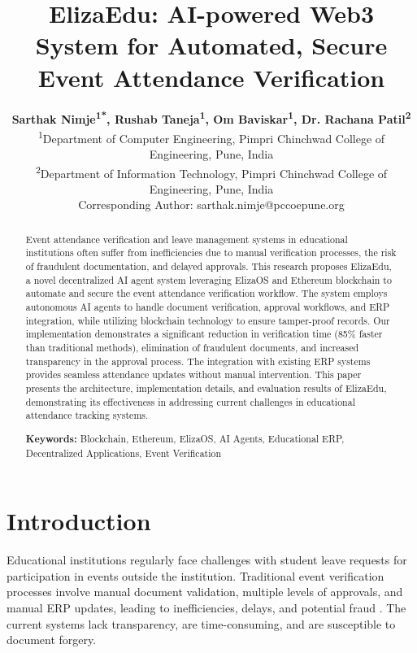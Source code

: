 \documentclass[a4paper,12pt]{article}
\begin{document}
\title{\Large \textbf{ElizaEdu: AI-powered Web3 System for Automated, Secure Event Attendance Verification}}

\author{
\textbf{Sarthak Nimje\textsuperscript{1*}, Rushab Taneja\textsuperscript{1}, Om Baviskar\textsuperscript{1}, Dr. Rachana Patil\textsuperscript{2}} \\
\small \textsuperscript{1}Department of Computer Engineering, Pimpri Chinchwad College of Engineering, Pune, India \\
\small \textsuperscript{2}Department of Information Technology, Pimpri Chinchwad College of Engineering, Pune, India \\
\small *Corresponding Author: sarthak.nimje@pccoepune.org
}

\date{}
\maketitle

\begin{abstract}
Event attendance verification and leave management systems in educational institutions often suffer from inefficiencies due to manual verification processes, the risk of fraudulent documentation, and delayed approvals. This research proposes ElizaEdu, a novel decentralized AI agent system leveraging ElizaOS and Ethereum blockchain to automate and secure the event attendance verification workflow. The system employs autonomous AI agents to handle document verification, approval workflows, and ERP integration, while utilizing blockchain technology to ensure tamper-proof records. Our implementation demonstrates a significant reduction in verification time (85\% faster than traditional methods), elimination of fraudulent documents, and increased transparency in the approval process. The integration with existing ERP systems provides seamless attendance updates without manual intervention. This paper presents the architecture, implementation details, and evaluation results of ElizaEdu, demonstrating its effectiveness in addressing current challenges in educational attendance tracking systems.

\textbf{Keywords:} Blockchain, Ethereum, ElizaOS, AI Agents, Educational ERP, Decentralized Applications, Event Verification
\end{abstract}

\section{Introduction}
Educational institutions regularly face challenges with student leave requests for participation in events outside the institution. Traditional event verification processes involve manual document validation, multiple levels of approvals, and manual ERP updates, leading to inefficiencies, delays, and potential fraud \cite{kumar2019educational}. The current systems lack transparency, are time-consuming, and are susceptible to document forgery.
\end{document}

